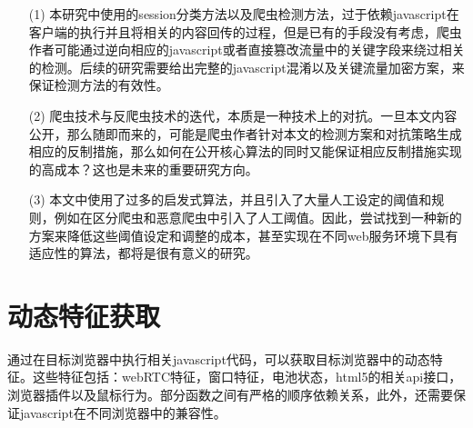 \documentclass[doctor,privacy,twoside]{buaa_mac}
\begin{document}
\begin{itemize}
\item[(1)] 本研究中使用的session分类方法以及爬虫检测方法，过于依赖javascript在客户端的执行并且将相关的内容回传的过程，但是已有的手段没有考虑，爬虫作者可能通过逆向相应的javascript或者直接篡改流量中的关键字段来绕过相关的检测。后续的研究需要给出完整的javascript混淆以及关键流量加密方案，来保证检测方法的有效性。

\item[(2)]  爬虫技术与反爬虫技术的迭代，本质是一种技术上的对抗。一旦本文内容公开，那么随即而来的，可能是爬虫作者针对本文的检测方案和对抗策略生成相应的反制措施，那么如何在公开核心算法的同时又能保证相应反制措施实现的高成本？这也是未来的重要研究方向。

\item[(3)] 本文中使用了过多的启发式算法，并且引入了大量人工设定的阈值和规则，例如在区分爬虫和恶意爬虫中引入了人工阈值。因此，尝试找到一种新的方案来降低这些阈值设定和调整的成本，甚至实现在不同web服务环境下具有适应性的算法，都将是很有意义的研究。

\end{itemize}




\appendix

\section{动态特征获取}

通过在目标浏览器中执行相关javascript代码，可以获取目标浏览器中的动态特征。这些特征包括：webRTC特征，窗口特征，电池状态，html5的相关api接口，浏览器插件以及鼠标行为。部分函数之间有严格的顺序依赖关系，此外，还需要保证javascript在不同浏览器中的兼容性。
\end{document}

